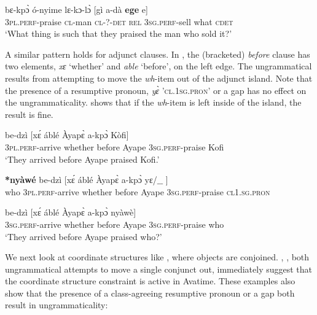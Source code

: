 \documentclass[output=paper]{langscibook}
\begin{document}
\ea
\gll bɛ-kp\`{ɔ} ó-nyime lɛ-kɔ-l\`{ɔ} [g\`{i} a-d\`{a} \textbf{ ege} e] \\
3\textsc{pl.perf}-praise \textsc{cl}-man \textsc{cl}-?-\textsc{det} \textsc{rel} 3\textsc{sg.perf}-sell what \textsc{cdet} \\
\glt `What thing is such that they praised the man who sold it?’
\z

A similar pattern holds for adjunct clauses.  In , the (bracketed) \textit{before} clause has two elements, \textit{xɛ} ‘whether’ and  \textit{able} ‘before’, on the left edge.   The ungrammatical  results from attempting to move the \textit{wh}-item out of the adjunct island. Note that the presence of a resumptive pronoun, \textit{y\`{ɛ}} '\textsc{cl.1sg.pron}' or a gap has no effect on the ungrammaticality.   shows that if the \textit{wh}-item is left inside of the island, the result is fine.  


\ea \label{ex:devlin:adj-island}
\begin{xlist}
\ex \label{ex:devlin:adj-island-base}
\gll  be-dz\`{i}  [x\'{ɛ} \'{a}bl\'{e} \`{A}yap\`{ɛ} a-kp\`{ɔ} K\`{o}fi]\\
3\textsc{pl.perf}-arrive whether before Ayape 3\textsc{sg.perf}-praise Kofi  \\
\glt `They arrived before Ayape praised Kofi.’

\ex \label{ex:devlin:adj-island-move}
\gll  \textbf{*ny\`{a}w\'{e}} be-dz\`{i}  [x\'{ɛ} \'{a}bl\'{e} \`{A}yap\`{ɛ} a-kp\`{ɔ} yɛ/$\_\_$ ]\\
who 3\textsc{pl.perf}-arrive whether before Ayape 3\textsc{sg.perf}-praise \textsc{cl1.sg.pron} {}\\
\glt 

\ex \label{ex:devlin:adj-island-insitu}
\gll be-dz\`{i}  [x\'{ɛ} \'{a}bl\'{e} \`{A}yap\`{ɛ} a-kp\`{ɔ} ny\`{a}w\`{e}]\\
3\textsc{sg.perf}-arrive whether before Ayape 3\textsc{sg.perf}-praise who  \\
\glt `They arrived before Ayape praised who?’ 
\end{xlist}
\z

We next look at coordinate structures like , where objects are conjoined. , , both ungrammatical attempts to move a  single conjunct out, immediately suggest that the coordinate structure constraint is active in Avatime.  These examples also show that the presence of a class-agreeing resumptive pronoun or a gap both result in ungrammaticality:
\end{document}
